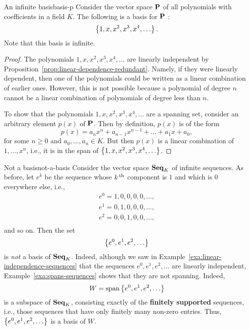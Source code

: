 \begin{example}{An infinite basis}{basis-p}
  Consider the vector space $\mathbf{P}$ of all polynomials with
  coefficients in a field $K$. The following is a basis for $\mathbf{P}$%
  :
  \begin{equation*}
    \left\{1, x, x^2, x^3, x^4, \ldots\right\}.
  \end{equation*}
  Note that this basis is infinite.
\end{example}

\begin{proof}
  The polynomials $1, x, x^2, x^3, x^4, \ldots$ are linearly
  independent by Proposition~\ref{prop:linear-dependence-redundant}.
  Namely, if they were linearly dependent, then one of the polynomials
  could be written as a linear combination of earlier ones. However,
  this is not possible because a polynomial of degree $n$ cannot be a
  linear combination of polynomials of degree less than $n$.

  To show that the polynomials $1, x, x^2, x^3, x^4, \ldots$ are a
  spanning set, consider an arbitrary element $p(x)$ of $\mathbf{P}$.
  Then by definition, $p(x)$ is of the form
  \begin{equation*}
    p(x) = a_nx^n + a_{n-1}x^{n-1} + \ldots + a_1x + a_0,
  \end{equation*}
  for some $n\geq 0$ and $a_0,\ldots,a_n\in K$. But then $p(x)$ is a
  linear combination of $1,\ldots,x^n$, i.e., it is in the span of
  $\left\{1, x, x^2, x^3, x^4, \ldots\right\}$.
\end{proof}

\begin{example}{Not a basis}{not-a-basis}
  Consider the vector space $\mathbf{Seq}_K$ of infinite sequences. As before,
  let $e^k$ be the sequence whose $k^{\,\rm th}$ component is $1$ and which is
  $0$ everywhere else, i.e.,
    \begin{equation*}
    \begin{array}{l}
      e^0 = 1,0,0,0,0,\ldots, \\
      e^1 = 0,1,0,0,0,\ldots, \\
      e^2 = 0,0,1,0,0,\ldots, \\
    \end{array}
  \end{equation*}
  and so on. Then the set
  \begin{equation*}
    \left\{e^0, e^1, e^2, \ldots\right\}
  \end{equation*}
  is \textit{not} a basis of $\mathbf{Seq}_K$. Indeed, although we saw in
  Example~\ref{exa:linear-independence-sequences} that the sequences
  $e^0, e^1, e^2, \ldots$ are linearly independent,
  Example~\ref{exa:spans-sequences} shows that they are not spanning.
  Indeed,
  \begin{equation*}
    W = \sspan\set{e^0, e^1, e^2, \ldots}
  \end{equation*}
  is a subspace of $\mathbf{Seq}_K$, consisting exactly of the
  \textbf{finitely supported}%
   sequences, i.e., those sequences
  that have only finitely many non-zero entries. Thus, $\left\{e^0, e^1,
    e^2, \ldots\right\}$ is a basis of $W$.
\end{example}

